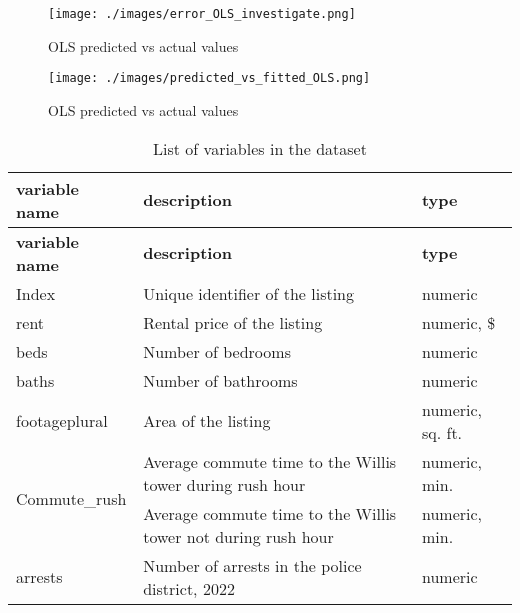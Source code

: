 \documentclass[12pt]{report}
\begin{document}
\begin{figure}[ht]
	\centering
	\texttt{[image: ./images/error\_OLS\_investigate.png]}
	\caption{OLS predicted vs actual values}
	\label{fig:ols-mistake}
\end{figure}

\begin{figure}[ht]
	\centering
	\texttt{[image: ./images/predicted\_vs\_fitted\_OLS.png]}
	\caption{OLS predicted vs actual values}
	\label{fig:ols-scatterplot}
\end{figure}

\printbibliography

\begin{longtable}{|p{4cm}|p{8.7cm}|p{2.5cm}|} %
	\caption{List of variables in the dataset}
	\hline
	\textbf{variable name}             & \textbf{description}                                                & \textbf{type}    \\ \hline
	\endfirsthead
	\hline
	\textbf{variable name}             & \textbf{description}                                                & \textbf{type}    \\ \hline
	\endhead
	Index                              & Unique identifier of the listing                                    & numeric          \\ \hline
	rent                               & Rental price of the listing                                         & numeric, \$      \\ \hline
	beds                               & Number of bedrooms                                                  & numeric          \\ \hline
	baths                              & Number of bathrooms                                                 & numeric          \\ \hline
	footageplural                      & Area of the listing                                                 & numeric, sq. ft. \\ \hline
	\multirow{2}{*}{Commute\_rush}     & Average commute time to the Willis tower during rush hour           & numeric, min.    \\ \hline
	\multirow{2}{*}{Commute\_nonrush}  & Average commute time to the Willis tower not during rush hour       & numeric, min.    \\ \hline
	arrests                            & Number of arrests in the police district, 2022                      & numeric          \\ \hline

\end{longtable}
\end{document}

